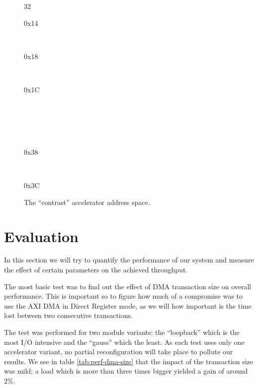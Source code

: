 \begin{figure}[tb]
{\begin{bytefield}[rightcurly=.,bitwidth=1.1em,endianness=big,bitformatting=\footnotesize\ttfamily,
	boxformatting={\centering\ttfamily},bitwidth=0.75em]{32}
\begin{rightwordgroup}{0x14}
\end{rightwordgroup}\\
\begin{rightwordgroup}{0x18}
\end{rightwordgroup}\\
\begin{rightwordgroup}{0x1C}
\end{rightwordgroup}\\
 \\
\skippedwords \\
 \\
\begin{rightwordgroup}{0x38}
\end{rightwordgroup}\\
\begin{rightwordgroup}{0x3C}
\end{rightwordgroup}
\end{bytefield}
}
\caption{The ``contrast'' accelerator address space.}
\label{fig:hls-map}
\end{figure}

\section{Evaluation}
\label{sec:evaluation}

In this section we will try to quantify the performance of our system and measure the effect
of certain parameters on the achieved throughput.

The most basic test was to find out the effect of DMA transaction size on overall performance.
This is important so to figure how much of a compromise was to use the AXI DMA in Direct Register mode,
as we will how important is the time lost between two consecutive transactions.

The test was performed for two module variants: the ``loopback'' which is the most I/O intensive and the ``gauss'' which the least.
As each test uses only one accelerator variant, no partial reconfiguration will take place to pollute our results.
We see in table \ref{tab:perf-dma-size} that the impact of the transaction size was mild; a load which
is more than three times bigger yielded a gain of around 2\%. 

